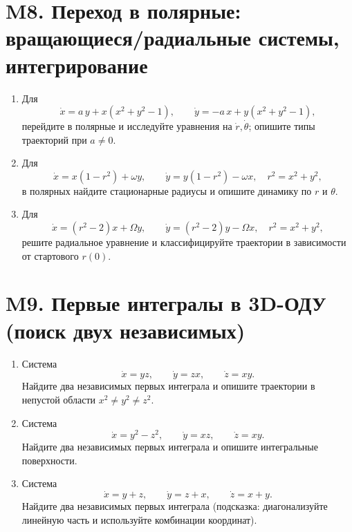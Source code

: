 \documentclass[12pt]{article}
\begin{document}
\section{M8. Переход в полярные: вращающиеся/радиальные системы, интегрирование}
\begin{enumerate}
\item Для
\[
\dot x = a\,y + x(x^2+y^2-1),\qquad
\dot y = -a\,x + y(x^2+y^2-1),
\]
перейдите в полярные и исследуйте уравнения на $\dot r,\dot\theta$; опишите типы траекторий при $a\ne0$.

\item Для
\[
\dot x = x(1-r^2)+\omega y,\qquad
\dot y = y(1-r^2)-\omega x,\quad r^2=x^2+y^2,
\]
в полярных найдите стационарные радиусы и опишите динамику по $r$ и $\theta$.

\item Для
\[
\dot x = (r^2-2)x + \Omega y,\qquad
\dot y = (r^2-2)y - \Omega x,\quad r^2=x^2+y^2,
\]
решите радиальное уравнение и классифицируйте траектории в зависимости от стартового $r(0)$.
\end{enumerate}

\section{M9. Первые интегралы в 3D-ОДУ (поиск двух независимых)}
\begin{enumerate}
\item Система
\[
\dot x = yz,\qquad \dot y = zx,\qquad \dot z = xy.
\]
Найдите два независимых первых интеграла и опишите траектории в непустой области $x^2\ne y^2\ne z^2$.

\item Система
\[
\dot x = y^2-z^2,\qquad \dot y = xz,\qquad \dot z = xy.
\]
Найдите два независимых первых интеграла и опишите интегральные поверхности.

\item Система
\[
\dot x = y+z,\qquad \dot y = z+x,\qquad \dot z = x+y.
\]
Найдите два независимых первых интеграла (подсказка: диагонализуйте линейную часть и используйте комбинации координат).
\end{enumerate}

\end{document}
